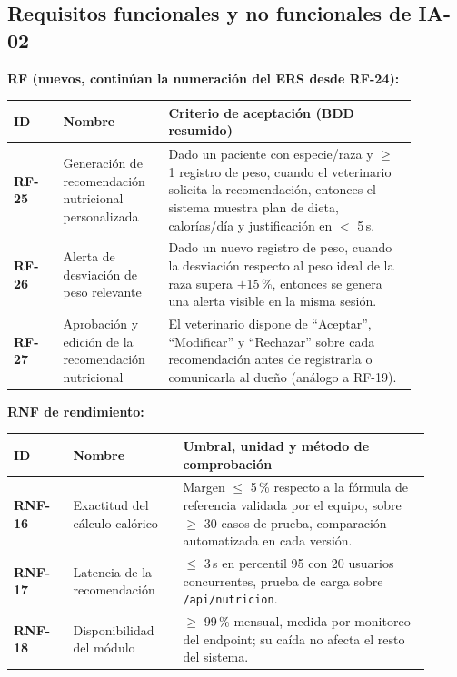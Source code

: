 \subsection{Requisitos funcionales y no funcionales de IA-02}
\label{sec:rfrnf-ia02}

\textbf{RF (nuevos, continúan la numeración del ERS desde RF-24):}

\begin{longtable}{@{}>{\bfseries}p{0.11\linewidth} >{\raggedright\arraybackslash}p{0.22\linewidth} >{\raggedright\arraybackslash}p{0.55\linewidth}@{}}
\toprule
\textbf{ID} & \textbf{Nombre} & \textbf{Criterio de aceptación (BDD resumido)} \\
\midrule
\endhead
\bottomrule
\endlastfoot
RF-25 & Generación de recomendación nutricional personalizada & Dado un paciente con especie/raza y $\geq$ 1 registro de peso, cuando el veterinario solicita la recomendación, entonces el sistema muestra plan de dieta, calorías/día y justificación en $<$ 5\,s. \\
RF-26 & Alerta de desviación de peso relevante & Dado un nuevo registro de peso, cuando la desviación respecto al peso ideal de la raza supera $\pm$15\,\%, entonces se genera una alerta visible en la misma sesión. \\
RF-27 & Aprobación y edición de la recomendación nutricional & El veterinario dispone de ``Aceptar'', ``Modificar'' y ``Rechazar'' sobre cada recomendación antes de registrarla o comunicarla al dueño (análogo a RF-19). \\
\end{longtable}

\textbf{RNF de rendimiento:}

\begin{longtable}{@{}>{\bfseries}p{0.13\linewidth} >{\raggedright\arraybackslash}p{0.24\linewidth} >{\raggedright\arraybackslash}p{0.54\linewidth}@{}}
\toprule
\textbf{ID} & \textbf{Nombre} & \textbf{Umbral, unidad y método de comprobación} \\
\midrule
\endhead
\bottomrule
\endlastfoot
RNF-16 & Exactitud del cálculo calórico & Margen $\leq$ 5\,\% respecto a la fórmula de referencia validada por el equipo, sobre $\geq$ 30 casos de prueba, comparación automatizada en cada versión. \\
RNF-17 & Latencia de la recomendación & $\leq$ 3\,s en percentil 95 con 20 usuarios concurrentes, prueba de carga sobre \texttt{/api/nutricion}. \\
RNF-18 & Disponibilidad del módulo & $\geq$ 99\,\% mensual, medida por monitoreo del endpoint; su caída no afecta el resto del sistema. \\
\end{longtable}

